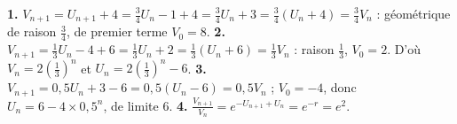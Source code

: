 \begin{corrige}
\textbf{1.} $V_{n+1} = U_{n+1}+4 = \frac34U_{n}-1+4 = \frac34U_{n}+3
= \frac34\left(U_{n}+4\right) = \frac34V_{n}$ : géométrique de raison
$\frac34$, de premier terme $V_{0} = 8$.
\textbf{2.} $V_{n+1} = \frac13U_{n}-4+6 = \frac13U_{n}+2
= \frac13\left(U_{n}+6\right) = \frac13V_{n}$ : raison $\frac13$,
$V_{0} = 2$. D'où $V_{n} = 2\left(\frac13\right)^{n}$ et
$U_{n} = 2\left(\frac13\right)^{n}-6$.
\textbf{3.} $V_{n+1} = 0{,}5U_{n}+3-6 = 0{,}5\left(U_{n}-6\right)
= 0{,}5V_{n}$ ; $V_{0} = -4$, donc $U_{n} = 6-4\times0{,}5^{n}$, de limite
$6$.
\textbf{4.} $\frac{V_{n+1}}{V_{n}} = e^{-U_{n+1}+U_{n}} = e^{-r} = e^{2}$.
\end{corrige}

